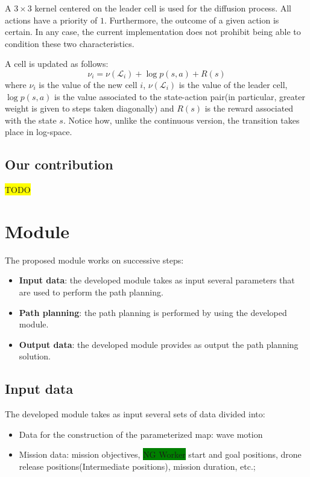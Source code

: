 \documentclass[journal,article,submit,pdftex,moreauthors]{Definitions/mdpi}
\begin{document}
A $3 \times 3$ kernel centered on the leader cell is used for the diffusion process. All actions have a priority of $1$. 
Furthermore, the outcome of a given action is certain. In any case, the current implementation does not prohibit being able to condition these two characteristics.

A cell is updated as follows:
\begin{equation*}\label{eq:weight_update_disc}
    \nu_i = \nu(\mathcal{L}_i) + \log p(s,a) + R(s)
\end{equation*}
where $\nu_i$ is the value  of the new cell $i$, $\nu(\mathcal{L}_i)$ is the value of the leader cell, $\log p(s,a)$ is the value associated to the state-action pair(in particular, greater weight is given to steps taken diagonally) and $R(s)$ is the reward associated with the state $s$. Notice how, unlike the continuous version, the transition takes place in log-space.


\subsection{Our contribution}
\colorbox{yellow}{TODO}


\section{Module}
The proposed module works on successive steps:
\begin{itemize}[labelsep=2.5mm,topsep=-3pt]
	\item \textbf{Input data}: the developed module takes as input several parameters that are used to perform the path planning. 
	\item \textbf{Path planning}: the path planning is performed by using the developed module. 
	\item \textbf{Output data}: the developed module provides as output the path planning solution.
\end{itemize}

\subsection{Input data}
The developed module takes as input several sets of data divided into:
\begin{itemize}
\item Data for the construction of the parameterized map: wave motion 
\item Mission data: mission objectives, \colorbox{green}{NG Worker} start and goal positions, drone release positions(Intermediate positions), 
	mission duration, etc.;
\end{itemize}
\end{document}
